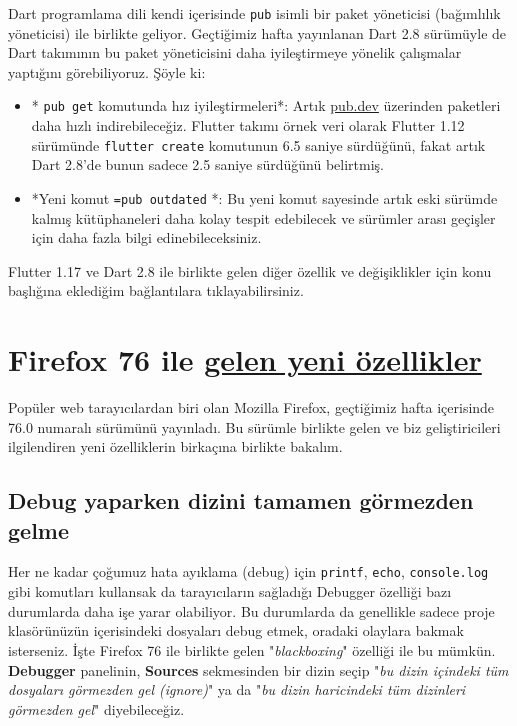 \documentclass[11pt]{article}
\begin{document}
Dart programlama dili kendi içerisinde \texttt{pub} isimli bir paket yöneticisi
(bağımlılık yöneticisi) ile birlikte geliyor. Geçtiğimiz hafta yayınlanan Dart
2.8 sürümüyle de Dart takımının bu paket yöneticisini daha iyileştirmeye
yönelik çalışmalar yaptığını görebiliyoruz. Şöyle ki:
\begin{itemize}
\item * \texttt{pub get} komutunda hız iyileştirmeleri*: Artık \href{https://pub.dev/}{pub.dev} üzerinden
paketleri daha hızlı indirebileceğiz. Flutter takımı örnek veri olarak
Flutter 1.12 sürümünde \texttt{flutter create} komutunun 6.5 saniye sürdüğünü,
fakat artık Dart 2.8'de bunun sadece 2.5 saniye sürdüğünü belirtmiş.
\item *Yeni komut \texttt{=pub outdated} *: Bu yeni komut sayesinde artık eski sürümde
kalmış kütüphaneleri daha kolay tespit edebilecek ve sürümler arası
geçişler için daha fazla bilgi edinebileceksiniz.
\end{itemize}

Flutter 1.17 ve Dart 2.8 ile birlikte gelen diğer özellik ve değişiklikler
için konu başlığına eklediğim bağlantılara tıklayabilirsiniz.
\section{Firefox 76 ile \href{https://hacks.mozilla.org/2020/05/firefox-76-audio-worklets-and-other-tricks/}{gelen yeni özellikler}}
\label{sec:org2ca2c3a}
Popüler web tarayıcılardan biri olan Mozilla Firefox, geçtiğimiz hafta
içerisinde 76.0 numaralı sürümünü yayınladı. Bu sürümle birlikte gelen ve biz
geliştiricileri ilgilendiren yeni özelliklerin birkaçına birlikte bakalım.

\subsection{Debug yaparken dizini tamamen görmezden gelme}
\label{sec:org8136b01}
Her ne kadar çoğumuz hata ayıklama (debug) için \texttt{printf}, \texttt{echo},
\texttt{console.log} gibi komutları kullansak da tarayıcıların sağladığı Debugger
özelliği bazı durumlarda daha işe yarar olabiliyor. Bu durumlarda da
genellikle sadece proje klasörünüzün içerisindeki dosyaları debug etmek,
oradaki olaylara bakmak isterseniz. İşte Firefox 76 ile birlikte gelen
"\emph{blackboxing}" özelliği ile bu mümkün. \textbf{\textbf{Debugger}} panelinin, \textbf{\textbf{Sources}}
sekmesinden bir dizin seçip "\emph{bu dizin içindeki tüm dosyaları görmezden gel
(ignore)}" ya da "\emph{bu dizin haricindeki tüm dizinleri görmezden gel}"
diyebileceğiz.
\end{document}
